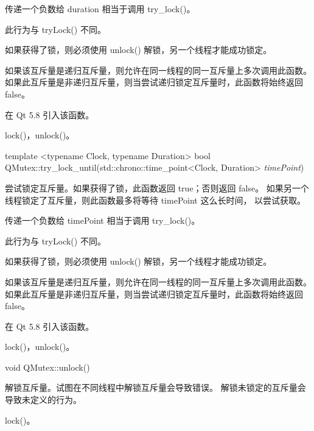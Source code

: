 \begin{notice}
传递一个负数给 duration 相当于调用 try\_lock()。
\end{notice}

此行为与 tryLock() 不同。

如果获得了锁，则必须使用 unlock() 解锁，另一个线程才能成功锁定。

如果该互斥量是递归互斥量，则允许在同一线程的同一互斥量上多次调用此函数。
如果此互斥量是非递归互斥量，则当尝试递归锁定互斥量时，此函数将始终返回 false。

在 Qt 5.8 引入该函数。

\begin{seeAlso}
lock()，unlock()。
\end{seeAlso}

template <typename Clock, typename Duration> bool QMutex::try\_lock\_until(std::chrono::time\_point<Clock, Duration> \emph{timePoint})

尝试锁定互斥量。如果获得了锁，此函数返回 true；否则返回 false。
如果另一个线程锁定了互斥量，则此函数最多将等待 timePoint 这么长时间，
以尝试获取。

\begin{notice}
传递一个负数给 timePoint 相当于调用 try\_lock()。
\end{notice}

此行为与 tryLock() 不同。

如果获得了锁，则必须使用 unlock() 解锁，另一个线程才能成功锁定。

如果该互斥量是递归互斥量，则允许在同一线程的同一互斥量上多次调用此函数。
如果此互斥量是非递归互斥量，则当尝试递归锁定互斥量时，此函数将始终返回 false。

在 Qt 5.8 引入该函数。

\begin{seeAlso}
lock()，unlock()。
\end{seeAlso}

void QMutex::unlock()

解锁互斥量。试图在不同线程中解锁互斥量会导致错误。
解锁未锁定的互斥量会导致未定义的行为。

\begin{seeAlso}
lock()。
\end{seeAlso}

